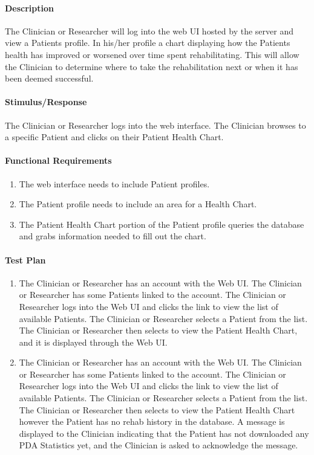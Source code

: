 \documentclass{article}
\begin{document}
\paragraph{Description}
The Clinician or Researcher will log into the web UI hosted by the server and view a Patients profile. In his/her profile a chart displaying how the Patients health has improved or worsened over time spent rehabilitating. This will allow the Clinician to determine where to take the rehabilitation next or when it has been deemed successful.

\paragraph{Stimulus/Response}
The Clinician or Researcher logs into the web interface. The Clinician browses to a specific Patient and clicks on their Patient Health Chart. 

\paragraph{Functional Requirements}
\begin{enumerate}
\item The web interface needs to include Patient profiles.
\item The Patient profile needs to include an area for a Health Chart.
\item The Patient Health Chart portion of the Patient profile queries the database and grabs information needed to fill out the chart.
\end{enumerate}

\paragraph{Test Plan}
\begin{enumerate}
\item The Clinician or Researcher has an account with the Web UI. The Clinician or Researcher has some Patients linked to the account. The Clinician or Researcher logs into the Web UI and clicks the link to view the list of available Patients. The Clinician or Researcher selects a Patient from the list. The Clinician or Researcher then selects to view the Patient Health Chart, and it is displayed through the Web UI.
\item The Clinician or Researcher has an account with the Web UI. The Clinician or Researcher has some Patients linked to the account. The Clinician or Researcher logs into the Web UI and clicks the link to view the list of available Patients. The Clinician or Researcher selects a Patient from the list. The Clinician or Researcher then selects to view the Patient Health Chart however the Patient has no rehab history in the database. A message is displayed to the Clinician indicating that the Patient has not downloaded any PDA Statistics yet, and the Clinician is asked to acknowledge the message.
\end{enumerate}
\end{document}
